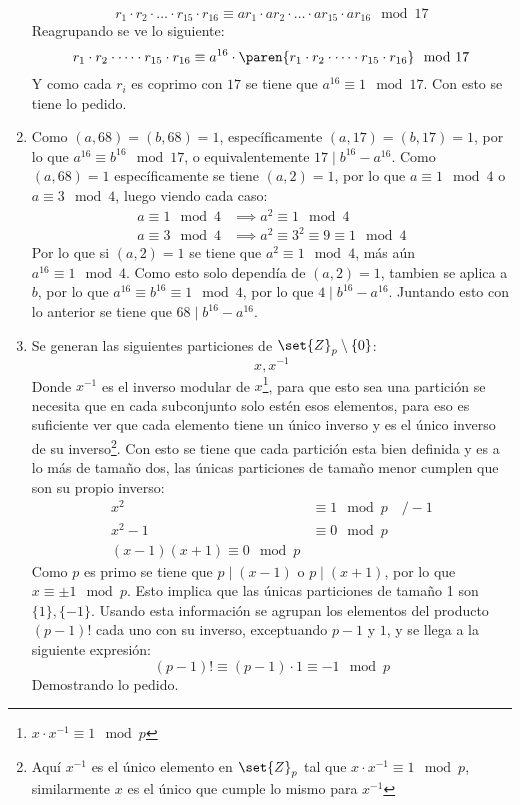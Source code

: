 \documentclass{ayudantia}
\begin{document}
\begin{enumerate}
    \[r_1\cdot r_2\cdot\dots\cdot r_{15}\cdot r_{16}\equiv ar_1\cdot ar_2\cdot\dots\cdot ar_{15}\cdot ar_{16}\mod 17\]
    Reagrupando se ve lo siguiente:
    \[r_1\cdot r_2\cdot\dots\cdot r_{15}\cdot r_{16}\equiv a^{16}\cdot\paren{r_1\cdot r_2\cdot\dots\cdot r_{15}\cdot r_{16}}\mod 17\]
    Y como cada \(r_i\) es coprimo con \(17\) se tiene que \(a^{16}\equiv 1\mod 17\). Con esto se tiene lo pedido.
    \item Como \((a,68)=(b,68)=1\), específicamente \((a,17)=(b,17)=1\), por lo que \(a^{16}\equiv b^{16}\mod 17\), o equivalentemente \(17\mid b^{16}-a^{16}\). Como \((a,68)=1\) específicamente se tiene \((a,2)=1\), por lo que \(a\equiv 1\mod 4\) o \(a\equiv 3\mod 4\), luego viendo cada caso:
    \begin{align*}
        a\equiv 1\mod 4&\implies a^2\equiv 1\mod 4\\
        a\equiv 3\mod 4&\implies a^2\equiv 3^2\equiv 9\equiv 1\mod 4
    \end{align*}
    Por lo que si \((a,2)=1\) se tiene que \(a^2\equiv  1\mod 4\), más aún \(a^{16}\equiv 1\mod 4\). Como esto solo dependía de \((a,2)=1\), tambien se aplica a \(b\), por lo que \(a^{16}\equiv b^{16}\equiv 1\mod 4\), por lo que \(4\mid b^{16}-a^{16}\). Juntando esto con lo anterior se tiene que \(68\mid b^{16}-a^{16}\).
    \item Se generan las siguientes particiones de \(\set{Z}_p\setminus\{0\}\):
    \[x,x^{-1}\]
    Donde \(x^{-1}\) es el inverso modular de \(x\)\footnote{\(x\cdot x^{-1}\equiv 1\mod p\)}, para que esto sea una partición se necesita que en cada subconjunto solo estén esos elementos, para eso es suficiente ver que cada elemento tiene un único inverso y es el único inverso de su inverso\footnote{Aquí \(x^{-1}\) es el único elemento en \(\set{Z}_p\) tal que \(x\cdot x^{-1}\equiv 1\mod p\), similarmente \(x\) es el único que cumple lo mismo para \(x^{-1}\)}. Con esto se tiene que cada partición esta bien definida y es a lo más de tamaño dos, las únicas particiones de tamaño menor cumplen que son su propio inverso:
    \begin{align*}
        x^2&\equiv 1\mod p\quad/-1\\
        x^2-1&\equiv 0\mod p\\
        (x-1)(x+1)\equiv 0\mod p
    \end{align*}
    Como \(p\) es primo se tiene que \(p\mid (x-1)\) o \(p\mid (x+1)\), por lo que \(x\equiv\pm 1\mod p\). Esto implica que las únicas particiones de tamaño 1 son \(\{1\},\{-1\}\). Usando esta información se agrupan los elementos del producto \((p-1)!\) cada uno con su inverso, exceptuando \(p-1\) y \(1\), y se llega a la siguiente expresión:
    \[(p-1)!\equiv (p-1)\cdot1\equiv -1\mod p\]
    Demostrando lo pedido.
\end{enumerate}
\end{document}
